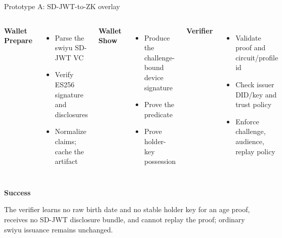 \documentclass[aspectratio=169]{beamer}
\newcommand{\sourcefoot}{}
\newcommand{\setsources}[1]{\renewcommand{\sourcefoot}{#1}}
\newcommand{\labelhead}[1]{{\small\bfseries\color{zkblue}#1}\par\vspace{0.25em}}
\begin{document}
\setsources{\href{https://github.com/privacy-ethereum/zkID/blob/main/specs/1-openac/README.md}{OpenAC spec}; \href{https://swiyu-admin-ch.github.io/technology-stack/}{swiyu Technology Stack}}
\begin{frame}{Prototype A: SD-JWT-to-ZK overlay}
  \begin{columns}[T,onlytextwidth]
      \labelhead{Wallet Prepare}
      \begin{itemize}
        \item Parse the swiyu SD-JWT VC
        \item Verify ES256 signature and disclosures
        \item Normalize claims; cache the artifact
      \end{itemize}

      \labelhead{Wallet Show}
      \begin{itemize}
        \item Produce the challenge-bound device signature
        \item Prove the predicate
        \item Prove holder-key possession
      \end{itemize}

      \labelhead{Verifier}
      \begin{itemize}
        \item Validate proof and circuit/profile id
        \item Check issuer DID/key and trust policy
        \item Enforce challenge, audience, replay policy
      \end{itemize}
  \end{columns}

  \vspace{0.4em}
  \labelhead{Success}
  The verifier learns no raw birth date and no stable holder key for an age
  proof, receives no SD-JWT disclosure bundle, and cannot replay the proof;
  ordinary swiyu issuance remains unchanged.
\end{frame}
\end{document}
